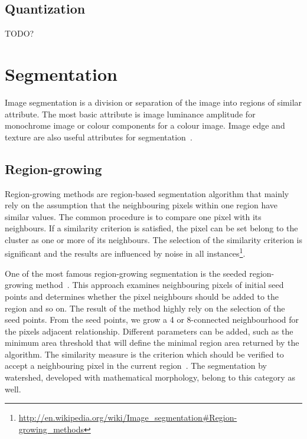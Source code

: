 \subsection{Quantization} %
\label{sub:quantization}
TODO?




\section{Segmentation} %
\label{sub:ap:segmentation}
Image segmentation is a division or separation of the image into regions of similar attribute.
The most basic attribute is image luminance amplitude for monochrome image or colour components for a colour image.
Image edge and texture are also useful attributes for segmentation~\cite{Pratt2007Digital}.

\subsection{Region-growing} %
\label{sub:ap:region_growing}
Region-growing methods are region-based segmentation algorithm that mainly rely on the assumption that the neighbouring pixels within one region have similar values.
The common procedure is to compare one pixel with its neighbours.
If a similarity criterion is satisfied, the pixel can be set belong to the cluster as one or more of its neighbours.
The selection of the similarity criterion is significant and the results are influenced by noise in all instances\footnote{\url{http://en.wikipedia.org/wiki/Image_segmentation\#Region-growing_methods}}.

One of the most famous region-growing segmentation is the seeded region-growing method~\cite{adams1994seeded,mehnert1997improved}.
This approach examines neighbouring pixels of initial seed points and determines whether the pixel neighbours should be added to the region and so on.
The result of the method highly rely on the selection of the seed points.
From the seed points, we grow a 4 or 8-connected neighbourhood for the pixels adjacent relationship.
Different parameters can be added, such as the minimum area threshold that will define the minimal region area returned by the algorithm.
The similarity measure is the criterion which should be verified to accept a neighbouring pixel in the current region~\cite{Gonzalez1992Digital}.
The segmentation by watershed, developed with mathematical morphology, belong to this category as well.


